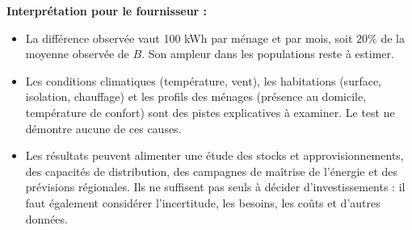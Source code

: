 {\begin{enumerate}
{\textbf{Interprétation pour le fournisseur :}
\begin{itemize}
\item La différence observée vaut 100 kWh par ménage et par mois, soit $20\%$ de la moyenne observée de $B$. Son ampleur dans les populations reste à estimer.
\item Les conditions climatiques (température, vent), les habitations (surface, isolation, chauffage) et les profils des ménages (présence au domicile, température de confort) sont des pistes explicatives à examiner. Le test ne démontre aucune de ces causes.
\item Les résultats peuvent alimenter une étude des stocks et approvisionnements, des capacités de distribution, des campagnes de maîtrise de l'énergie et des prévisions régionales. Ils ne suffisent pas seuls à décider d'investissements : il faut également considérer l'incertitude, les besoins, les coûts et d'autres données.
\end{itemize}
}


\end{enumerate}}
